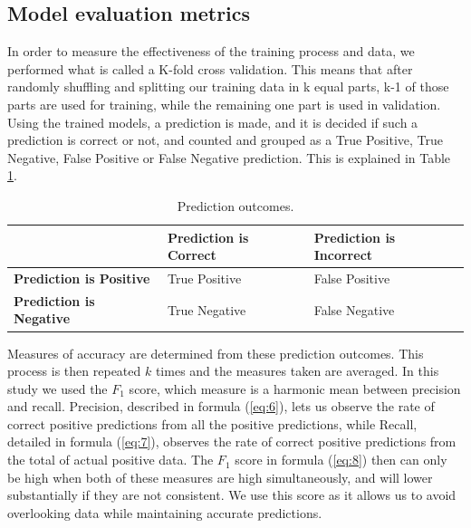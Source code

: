 \documentclass[review]{elsarticle}
\begin{document}



\subsection{Model evaluation metrics}
\label{model_evaluation}

In order to measure the effectiveness of the training process and data, we performed what is called a K-fold cross validation. This means that after randomly shuffling and splitting our training data in k equal parts, k-1 of those parts are used for training, while the remaining one part is used in validation. Using the trained models, a prediction is made, and it is decided if such a prediction is correct or not, and counted and grouped as a True Positive, True Negative, False Positive or False Negative prediction. This is explained in Table \ref{tab:preds}.

\begin{table}[htp] \centering
\caption{Prediction outcomes.}\label{tab:preds}
\begin{tabular}{|>{\centering\arraybackslash}m{7em}|>{\centering\arraybackslash}m{7em}|>{\centering\arraybackslash}m{7em}|} \arrayrulecolor{white}\hline %
\multicolumn{1}{c|}{} & \cellcolor{Mustard}\textbf{Prediction is Correct} & \cellcolor{LightPlum}\textbf{Prediction is Incorrect} \\ \hline
\cellcolor{DarkBlue}\textbf{Prediction is Positive} & \cellcolor{DeepGreen}True Positive & \cellcolor{DeepPurple}False Positive \\ \hline
\cellcolor{DeepSalmon}\textbf{Prediction is Negative} & \cellcolor{orange}True Negative & \cellcolor{Plum}False Negative \\ \hline
\end{tabular}
\end{table}

Measures of accuracy are determined from these prediction outcomes. This process is then repeated \(k\) times and the measures taken are averaged. In this study we used the \(F_{1}\) score, which measure is a harmonic mean between precision and recall. Precision, described in formula (\ref{eq:6}), lets us observe the rate of correct positive predictions from all the positive predictions, while Recall, detailed in formula (\ref{eq:7}), observes the rate of correct positive predictions from the total of actual positive data. The \(F_{1}\) score in formula (\ref{eq:8}) then can only be high when both of these measures are high simultaneously, and will lower substantially if they are not consistent. We use this score as it allows us to avoid overlooking data while maintaining accurate predictions.
\end{document}
